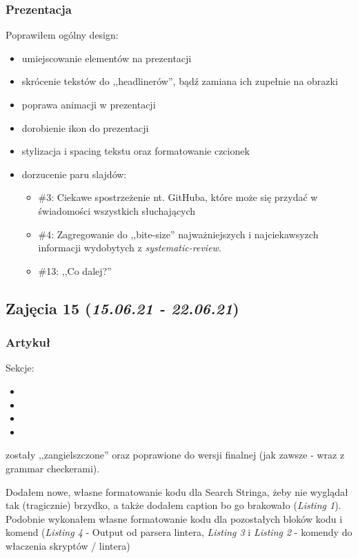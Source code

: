 \documentclass[graybox]{svmult}
\begin{document}
\subsubsection{Prezentacja}

Poprawiłem ogólny design:
\begin{itemize}
  \item umiejscowanie elementów na prezentacji
  \item skrócenie tekstów do ,,headlinerów'', bądź zamiana ich zupełnie na obrazki
  \item poprawa animacji w prezentacji
  \item dorobienie ikon do prezentacji
  \item stylizacja i spacing tekstu oraz formatowanie czcionek
  \item dorzucenie paru slajdów:
  \begin{itemize}
    \item \#3: Ciekawe spostrzeżenie nt. GitHuba, które może się przydać w świadomości wszystkich słuchających
    \item \#4: Zagregowanie do ,,bite-size'' najważniejszych i najciekawsyzch informacji wydobytych z \emph{systematic-review}. 
    \item \#13: ,,Co dalej?''
  \end{itemize}
\end{itemize}


\subsection{Zajęcia 15 (\emph{15.06.21 - 22.06.21})}

\subsubsection{Artykuł}

Sekcje:

\begin{itemize}
\item {}
\item {}
\item {}
\item {}
\end{itemize}

zostały ,,zangielszczone'' oraz poprawione do wersji finalnej (jak zawsze - wraz z grammar checkerami).

Dodałem nowe, własne formatowanie kodu dla Search Stringa, żeby nie wyglądał tak (tragicznie) brzydko, a także dodałem caption  bo go brakowało (\emph{Listing 1}). Podobnie wykonałem własne formatowanie kodu dla pozostałych bloków kodu i komend (\emph{Listing 4} - Output od parsera lintera, \emph{Listing 3} i  \emph{Listing 2} - komendy do właczenia skryptów / lintera)
\end{document}

